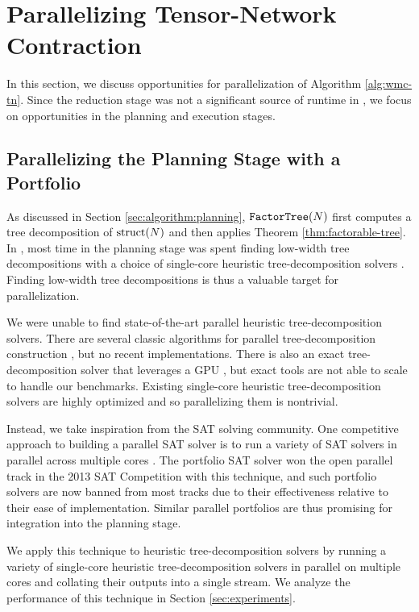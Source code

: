\section{Parallelizing Tensor-Network Contraction}
\label{sec:parallel}

In this section, we discuss opportunities for parallelization of Algorithm \ref{alg:wmc-tn}. Since the reduction stage was not a significant source of runtime in \cite{DDV19}, we focus on opportunities in the planning and execution stages.

\subsection{Parallelizing the Planning Stage with a Portfolio}
\label{sec:parallel:planning}
As discussed in Section \ref{sec:algorithm:planning}, $\texttt{\upshape FactorTree}(N)$ first computes a tree decomposition of $\text{struct}(N)$ and then applies Theorem \ref{thm:factorable-tree}. In \cite{DDV19}, most time in the planning stage was spent finding low-width tree decompositions with a choice of single-core heuristic tree-decomposition solvers \cite{AMW17,HS18,Tamaki17}. Finding low-width tree decompositions is thus a valuable target for parallelization.

We were unable to find state-of-the-art parallel heuristic tree-decomposition solvers. There are several classic algorithms for parallel tree-decomposition construction \cite{Lagergren90,SWG13}, but no recent implementations. There is also an exact tree-decomposition solver that leverages a GPU \cite{VB17}, but exact tools are not able to scale to handle our benchmarks. Existing single-core heuristic tree-decomposition solvers are highly optimized and so parallelizing them is nontrivial.

Instead, we take inspiration from the SAT solving community. One competitive approach to building a parallel SAT solver is to run a variety of SAT solvers in parallel across multiple cores \cite{BSS15,MSSS13,XHHL08}. The portfolio SAT solver  \cite{MSSS13} won the open parallel track in the 2013 SAT Competition with this technique, and such portfolio solvers are now banned from most tracks due to their effectiveness relative to their ease of implementation. Similar parallel portfolios are thus promising for integration into the planning stage.

We apply this technique to heuristic tree-decomposition solvers by running a variety of single-core heuristic tree-decomposition solvers in parallel on multiple cores and collating their outputs into a single stream. We analyze the performance of this technique in Section \ref{sec:experiments}.

